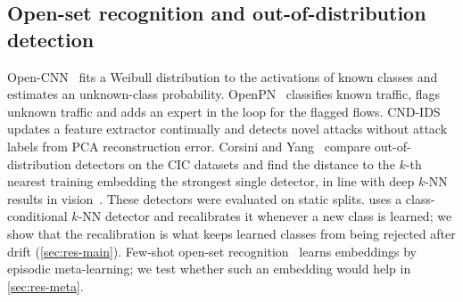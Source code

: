 \subsection{Open-set recognition and out-of-distribution detection}
Open-CNN~\cite{zhang2020osr} fits a Weibull distribution to the activations of known classes and estimates an
unknown-class probability. OpenPN~\cite{yuan2026openpn} classifies known traffic, flags unknown traffic and adds an
expert in the loop for the flagged flows. CND-IDS~\cite{fuhrman2025cnd} updates a feature extractor continually and
detects novel attacks without attack labels from PCA reconstruction error. Corsini and Yang~\cite{corsini2023ood} compare out-of-distribution detectors on the CIC
datasets and find the distance to the $k$-th nearest training embedding the strongest single detector, in line
with deep $k$-NN results in vision~\cite{sun2022knn}. These detectors were evaluated on static splits.
\nova{} uses a class-conditional $k$-NN detector and recalibrates it whenever a new class is learned; we show
that the recalibration is what keeps learned classes from being rejected after drift (\cref{sec:res-main}).
Few-shot open-set recognition~\cite{liu2020peeler} learns embeddings by episodic meta-learning; we test whether
such an embedding would help in \cref{sec:res-meta}.
